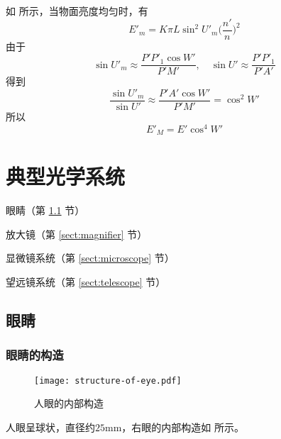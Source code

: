 \documentclass[cn,10pt,chinesefont=founder,math=mtpro2,cite=super,toc=onecol,twoside,openany]{elegantbook}
\begin{document}
如 所示，当物面亮度均匀时，有
\begin{equation}
E'_m=K\pi L\sin^2U'_m\bigg(\frac{n'}{n}\bigg)^2
\end{equation}
由于
\begin{equation}
\sin U'_m\approx\frac{P'P'_1\cos W'}{P'M'},\quad\sin U'\approx\frac{P'P'_1}{P'A'}
\end{equation}
得到
\begin{equation}
\frac{\sin U'_m}{\sin U'}\approx\frac{P'A'\cos W'}{P'M'}=\cos^2 W'
\end{equation}
所以
\begin{equation}
E'_M=E'\cos^4 W'
\end{equation}

\chapter{典型光学系统}

\begin{introduction}
	\item 眼睛（第 \ref{sect:eye} 节）
	\item 放大镜（第 \ref{sect:magnifier} 节）
	\item 显微镜系统（第 \ref{sect:microscope} 节）
	\item 望远镜系统（第 \ref{sect:telescope} 节）
\end{introduction}

\section{眼睛}
\label{sect:eye}
\subsection{眼睛的构造}

\begin{figure}[htbp]
	\centering
	\texttt{[image: structure-of-eye.pdf]}
	\caption{人眼的内部构造}
	\label{fig:structure-of-eye}
\end{figure}

人眼呈球状，直径约$25\mathrm{mm}$，右眼的内部构造如 所示。
\end{document}
